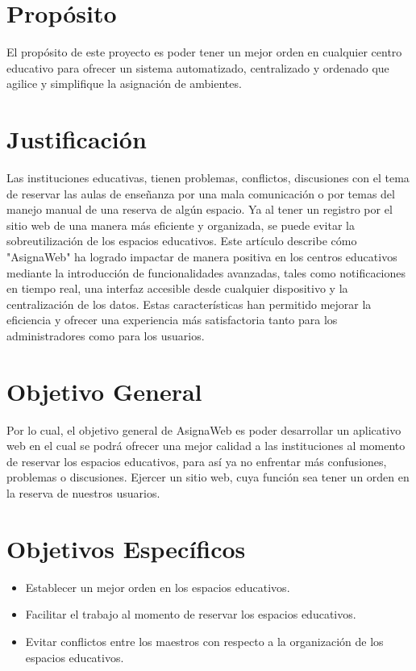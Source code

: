 \documentclass[12pt,a4paper]{article}
\begin{document}
\begin{multicols}{2}
\section*{Propósito}
El propósito de este proyecto es poder tener un mejor orden en cualquier centro educativo para ofrecer un sistema automatizado, centralizado  y ordenado que agilice y simplifique la asignación de ambientes.

\section*{Justificación}
Las instituciones educativas, tienen problemas, conflictos, discusiones con el tema de reservar las aulas de enseñanza por una mala comunicación o por temas del manejo manual de una reserva de algún espacio. Ya al  tener un registro por el sitio web de una manera más  eficiente y organizada, se puede evitar la sobreutilización de los espacios educativos.
Este artículo describe cómo "AsignaWeb" ha logrado impactar de manera positiva en los centros educativos mediante la introducción de funcionalidades avanzadas, tales como notificaciones en tiempo real, una interfaz accesible desde cualquier dispositivo y la centralización de los datos. Estas características han permitido mejorar la eficiencia y ofrecer una experiencia más satisfactoria tanto para los administradores como para los usuarios.



\section*{Objetivo General}
Por lo cual, el objetivo general de AsignaWeb es poder desarrollar un aplicativo web en el cual se podrá ofrecer una mejor calidad a las instituciones al momento de reservar los espacios educativos, para así ya no enfrentar más confusiones, problemas o discusiones. Ejercer un sitio web, cuya función sea tener un orden en la reserva de nuestros usuarios.

\section*{Objetivos Específicos}
\begin{itemize}
    \item Establecer un mejor orden en los espacios educativos.
    \item Facilitar el trabajo al momento de reservar los espacios educativos.
    \item Evitar conflictos entre los maestros con respecto a la organización de los espacios educativos.
\end{itemize}


\end{multicols}
\end{document}
